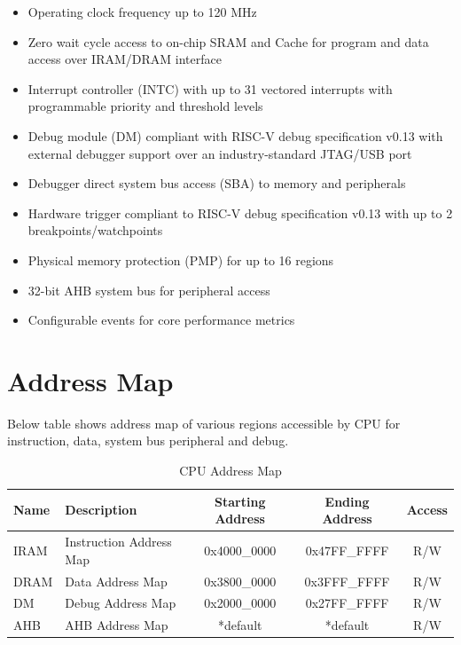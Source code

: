 \documentclass[main\_\_EN.tex]{subfiles}
\begin{document}
\begin{itemize}

    \item Operating clock frequency up to 120 MHz
    \item Zero wait cycle access to on-chip SRAM and Cache for program and data access over IRAM/DRAM interface
    \item Interrupt controller (INTC) with up to 31 vectored interrupts with programmable priority and threshold levels
    \item Debug module (DM) compliant with RISC-V debug specification v0.13 with external debugger support over an industry-standard JTAG/USB port
    \item Debugger direct system bus access (SBA) to memory and peripherals
    \item Hardware trigger compliant to RISC-V debug specification v0.13 with up to 2 breakpoints/watchpoints
    \item Physical memory protection (PMP) for up to 16 regions
    \item 32-bit AHB system bus for peripheral access
    \item Configurable events for core performance metrics

\end{itemize}


\section{Address Map}

Below table shows address map of various regions accessible by CPU for instruction, data, system bus peripheral and debug.

\begin{longtable}{| l| l |c | c | c  |}
\caption{CPU Address Map} \label{tab:riscvcpu-mem-blocks}
\\ \hline
\rowcolor{lightgray}
Name & Description    &  Starting Address  &  Ending Address  & Access   \\ \hline
IRAM\label{TBD1} & Instruction Address Map  &   0x4000\_0000  &  0x47FF\_FFFF  &  R/W  \\ \hline
DRAM\label{TBD2} & Data Address Map &     0x3800\_0000  &  0x3FFF\_FFFF  &  R/W  \\ \hline
DM \label{TBD4} & Debug Address Map  &      0x2000\_0000  &  0x27FF\_FFFF  &  R/W  \\ \hline
AHB\label{TBD3} & AHB Address Map &      *default  &  *default  &  R/W  \\ \hline
\end{longtable}
\end{document}
